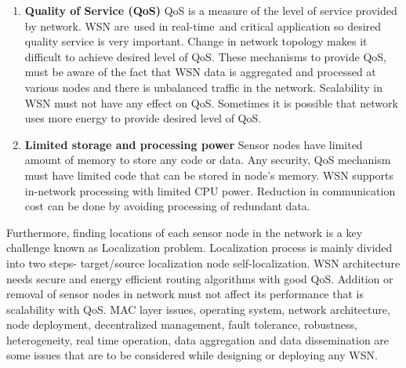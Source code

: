 \begin{enumerate}[label=\textbf{\roman*.}]
    \item \textbf{Quality of Service (QoS) }
    QoS is a measure of the level of service provided by network. WSN are\textcolor{white}{e}used in real-time\textcolor{white}{e}and critical application so desired quality service is very important. Change in network topology makes it difficult to achieve desired level of QoS. These mechanisms to provide QoS, must be aware of the fact that WSN data is aggregated and processed at various nodes and there is unbalanced traffic in the network. Scalability in WSN must not have any effect on QoS. Sometimes it is possible that network uses more energy to provide desired level of QoS.
    \item \textbf{Limited storage and processing power }
    Sensor nodes have limited amount of memory to store any code or data. Any security, QoS mechanism must have limited code that can be stored in node’s memory. WSN supports in-network processing with limited CPU power. Reduction in communication cost can be done by avoiding processing of redundant data.
\end{enumerate}
Furthermore, finding locations of each sensor node in the network is a key challenge known as Localization problem. Localization process is mainly divided into two steps- target/source localization node self-localization. WSN architecture needs secure and energy efficient routing algorithms with good QoS. Addition or removal of sensor nodes in network must not affect its performance that is scalability with QoS. MAC layer issues, operating system, network  architecture, node deployment, decentralized management, fault tolerance, robustness, heterogeneity, real time operation, data aggregation and data dissemination are some issues that are to be considered while designing or deploying any WSN.

